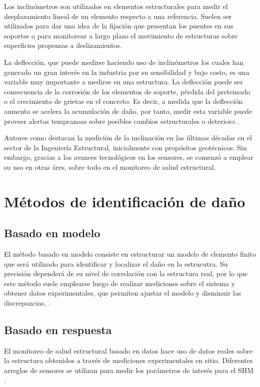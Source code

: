 \begin{itemize}
        Los inclinómetros son utilizados en elementos estructurales para medir el desplazamiento lineal de un elemento respecto a una referencia. Suelen ser utilizados para dar una idea de la fijación que presentan los puentes en sus soportes o para monitorear a largo plazo el movimiento de estructuras sobre superficies propensas a deslizamientos.

        La deflección, que puede medirse haciendo uso de inclinómetros los cuales han generado un gran interés en la industria por su sensibilidad y bajo costo, es una variable muy importante a medirse en una estructura. La deflección puede ser consecuencia de la corrosión de los elementos de soporte, pérdida del pretensado o el crecimiento de grietas en el concreto. Es decir, a medida que la deflección aumenta se acelera la acumulación de daño, por tanto, medir esta variable puede proveer alertas tempranoas sobre posibles cambios estructurales o deterioro \citep{zhang2017bridge}.

        Autores como \citet{komarizadehasl2022development} destacan la medición de la inclinación en las últimas décadas en el sector de la Ingeniería Estructural, inicialmente con propósitos geotécnicos. Sin embargo, gracias a los avances tecnológicos en los sensores, se comenzó a emplear su uso en otras áres, sobre todo en el monitoreo de salud estructural.

    \end{itemize}

\section{Métodos de identificación de daño}

    \subsection{Basado en modelo} El método basado en modelo consiste en estructurar un modelo de elemento finito que será utilizado para identificar y localizar el daño en la estrucutra. Su precisión dependerá de su nivel de correlación con la estructura real, por lo que este método suele emplearse luego de realizar mediciones sobre el sistema y obtener datos experimentales, que permiten ajustar el modelo y disminuir las discrepancias, \citep{garcia2023review}.

    \subsection{Basado en respuesta} El monitoreo de salud estructural basado en datos hace uso de datos reales sobre la estructura obtenidos a través de mediciones experimentales en sitio. Diferentes arreglos de sensores se utilizan para medir los parámetros de interés para el SHM \citep{mohamed2014}.


